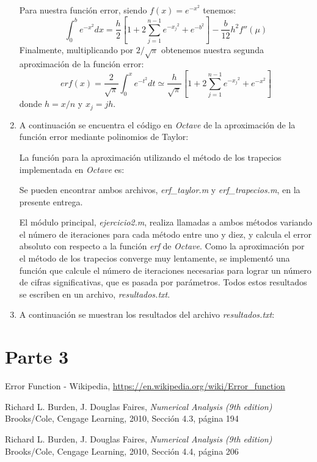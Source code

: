 \documentclass[titlepage,a4paper]{article}
\begin{document}
\begin{enumerate}[label=(\alph*)]
			Para nuestra función error, siendo $f(x) = e^{-x^2}$ tenemos:
				\begin{equation}
					\int_{0}^{b}e^{-x^2}dx = \frac{h}{2}\left[1 + 2\sum_{j=1}^{n-1}e^{-{x_j}^2}+e^{-b^2}\right]-\frac{b}{12}h^{2}f''(\mu)
				\end{equation}
			Finalmente, multiplicando por $2/\sqrt{\pi}$ obtenemos nuestra segunda aproximación de la función error:
				\begin{equation}
					erf(x) = \frac{2}{\sqrt{\pi}}\int_{0}^{x}e^{-t^2}dt \simeq \frac{h}{\sqrt{\pi}}\left[1 + 2\sum_{j=1}^{n-1}e^{-{x_j}^2}+e^{-x^2}\right]
				\end{equation}
			donde $h = x/n$ y $x_j = jh$.
		
		\item
			A continuación se encuentra el código en \emph{Octave} de la aproximación de la función error mediante polinomios de Taylor:
			
			
			La función para la aproximación utilizando el método de los trapecios implementada en \emph{Octave} es:
			

			Se pueden encontrar ambos archivos, \textit{erf\_taylor.m} y \textit{erf\_trapecios.m}, en la presente entrega.

			El módulo principal, \textit{ejercicio2.m}, realiza llamadas a ambos métodos variando el número de iteraciones para 
			cada método entre uno y diez, y calcula el error absoluto con respecto a la función \emph{erf} de \emph{Octave}.
			Como la aproximación por el método de los trapecios converge muy lentamente, se implementó una función que calcule el número 
			de iteraciones necesarias para lograr un número de cifras significativas, que es pasada por parámetros.
			Todos estos resultados se escriben en un archivo, \emph{resultados.txt}.
			
		
		\item
			A continuación se muestran los resultados del archivo \emph{resultados.txt}:
			

	\end{enumerate}


\section{Parte 3}\label{sec:parte3}


\begin{thebibliography}{9} 
		Error Function - Wikipedia, \url{https://en.wikipedia.org/wiki/Error_function}
	
		Richard L. Burden, J. Douglas Faires, \emph{Numerical Analysis (9th edition)} \\
		Brooks/Cole, Cengage Learning, 2010, Sección 4.3, página 194

	Richard L. Burden, J. Douglas Faires, \emph{Numerical Analysis (9th edition)} \\
	Brooks/Cole, Cengage Learning, 2010, Sección 4.4, página 206
	 
\end{thebibliography}
\end{document}
